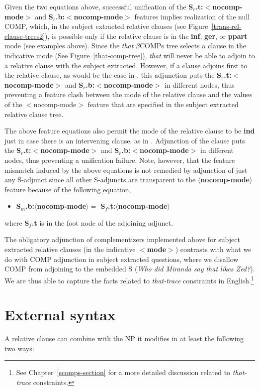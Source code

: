 Given the two equations above, successful unification of the {\bf
S$_r$.t:$<$nocomp-mode$>$} and {\bf S$_r$.b:$<$nocomp-mode$>$} features
implies realization of the null COMP, which, in the subject extracted
relative clauses (see Figure~\ref{trans-rel-clause-trees2}), is possible
only if the relative clause is in the {\bf inf}, {\bf ger}, or {\bf ppart}
mode (see examples above). Since the {\it that} $\beta$COMPs tree selects a
clause in the indicative mode (See Figure~\ref{that-comp-tree}), {\it that}
will never be able to adjoin to a relative clause with the subject
extracted. However, if a clause adjoins first to the relative clause, as
would be the case in , this adjunction puts the {\bf
S$_r$.t:$<$nocomp-mode$>$} and {\bf S$_r$.b:$<$nocomp-mode$>$} in different
nodes, thus preventing a feature clash between the mode of the relative
clause and the values of the $<$nocomp-mode$>$ feature that are specified
in the subject extracted relative clause tree.

The above feature equations also permit the mode of the relative clause to
be {\bf ind} just in case there is an intervening clause, as in
. Adjunction of the clause puts the {\bf S$_r$.t:$<$nocomp-mode$>$}
and {\bf S$_r$.b:$<$nocomp-mode$>$} in different nodes, thus preventing a
unification failure. Note, however, that the feature mismatch induced by
the above equations is not remedied by adjunction of just any S-adjunct
since all other S-adjuncts are transparent to the {\bf
$\langle$nocomp-mode$\rangle$} feature because of the following equation,

\begin{itemize}
\item {\bf S$_{m}$.b:$\langle$nocomp-mode$\rangle =$
S$_{f}$.t:$\langle$nocomp-mode$\rangle$}
\end{itemize}

where {\bf S$_{f}$.t} is in the foot node of the adjoining adjunct.


The obligatory adjunction of complementizers implemented above for subject
extracted relative clauses (in the indicative {\bf $<$mode$>$}) contrasts
with what we do with COMP adjunction in subject extracted questions, where
we disallow COMP from adjoining to the embedded S ({\it *Who did Miranda
say that likes Zed?}). We are thus able to capture the facts related to
{\it that-trace} constraints in English.\footnote{%
%
See Chapter~\ref{scomps-section} for a more detailed discussion related to
{\it that-trace} constraints.%
%
}

\section{External syntax}
A relative clause can combine with the NP it modifies in at least 
the following two ways:

